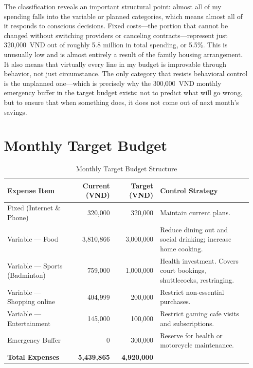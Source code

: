 The classification reveals an important structural point: almost all of my spending falls into the variable or planned categories, which means almost all of it responds to conscious decisions. Fixed costs---the portion that cannot be changed without switching providers or canceling contracts---represent just 320,000~VND out of roughly 5.8 million in total spending, or 5.5\%. This is unusually low and is almost entirely a result of the family housing arrangement. It also means that virtually every line in my budget is improvable through behavior, not just circumstance. The only category that resists behavioral control is the unplanned one---which is precisely why the 300,000~VND monthly emergency buffer in the target budget exists: not to predict what will go wrong, but to ensure that when something does, it does not come out of next month's savings.



\section{Monthly Target Budget}

\begin{table}[H]
\caption{Monthly Target Budget Structure}
\label{tab:target_budget}
\begin{tabularx}{\linewidth}{@{}lrrL@{}}
\toprule
\textbf{Expense Item} & \textbf{Current (VND)} & \textbf{Target (VND)} & \textbf{Control Strategy} \\
\midrule
Fixed (Internet \& Phone)       & 320,000   & 320,000   & Maintain current plans. \\
Variable --- Food               & 3,810,866 & 3,000,000 & Reduce dining out and social drinking; increase home cooking. \\
Variable --- Sports (Badminton) & 759,000   & 1,000,000 & Health investment. Covers court bookings, shuttlecocks, restringing. \\
Variable --- Shopping online    & 404,999   & 200,000   & Restrict non-essential purchases. \\
Variable --- Entertainment      & 145,000   & 100,000   & Restrict gaming cafe visits and subscriptions. \\
Emergency Buffer                & 0         & 300,000   & Reserve for health or motorcycle maintenance. \\
\midrule
\textbf{Total Expenses} & \textbf{5,439,865} & \textbf{4,920,000} & \\
\bottomrule
\end{tabularx}
\end{table}

